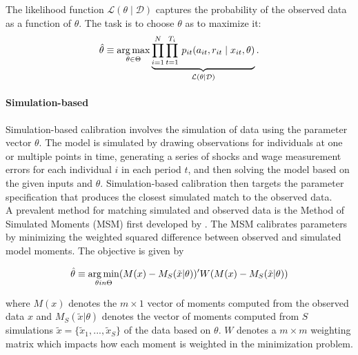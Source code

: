 \noindent The likelihood function $\mathcal{L}(\theta\mid\mathcal{D})$ captures the probability of the observed data as a function of $\theta$. The task is to choose $\theta$ as to maximize it:
%
\begin{align*}
  \hat{\theta} \equiv \operatorname*{arg\,max}_{\theta \in \Theta}  \underbrace{\prod^N_{i= 1} \prod^{T_i}_{t= 1}\, p_{it}(a_{it}, r_{it} \mid x_{it}, \theta)}_{\mathcal{L}(\theta\mid\mathcal{D})}.
\end{align*}

\paragraph{Simulation-based}

Simulation-based calibration involves the simulation of data using the parameter vector $\theta$. The model is simulated by drawing observations for individuals at one or multiple points in time, generating a series of shocks and wage measurement errors for each individual $i$ in each period $t$, and then solving the model based on the given inputs and $\theta$. Simulation-based calibration then targets the parameter specification that produces the closest simulated match to the observed data.\\

\noindent A prevalent method for matching simulated and observed data is the Method of Simulated Moments (MSM) first developed by \citet{McFadden.1989}. The MSM calibrates parameters by minimizing the weighted squared difference between observed and simulated model moments. The objective is given by

\begin{align*}
	\hat{\theta} \equiv \operatorname*{arg\,min}_{\theta in \Theta} (M(x) - M_S(\tilde{x}| \theta))' W (M(x) - M_S(\tilde{x}|\theta))
\end{align*}

where $M(x)$ denotes the $m \times 1$ vector of moments computed from the observed data $x$
and $M_S(\tilde{x}| \theta)$ denotes the vector of moments computed from $S$ simulations $\tilde{x} = \{\tilde{x}_1, ... , \tilde{x}_S\}$ of the data based on $\theta$. $W$ denotes a $m \times m$ weighting matrix which impacts how each moment is weighted in the minimization problem.